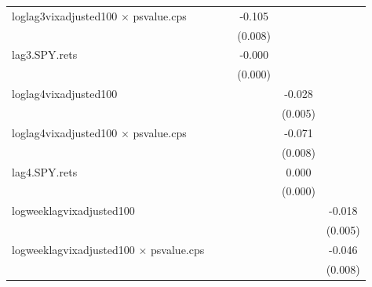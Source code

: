\documentclass[11pt,a4paper,oldfontcommands]{memoir}
\begin{document}
{\begin{footnotesize}
\begin{tiny}
\begin{longtable}{l*{5}{c}}
loglag3vixadjusted100 $\times$ psvalue.cps&                     &                     &      -0.105\sym{***}&                     &                     \\
                    &                     &                     &     (0.008)         &                     &                     \\
 
lag3.SPY.rets       &                     &                     &      -0.000\sym{***}&                     &                     \\
                    &                     &                     &     (0.000)         &                     &                     \\
 
loglag4vixadjusted100&                     &                     &                     &      -0.028\sym{***}&                     \\
                    &                     &                     &                     &     (0.005)         &                     \\
 
loglag4vixadjusted100 $\times$ psvalue.cps&                     &                     &                     &      -0.071\sym{***}&                     \\
                    &                     &                     &                     &     (0.008)         &                     \\
 
lag4.SPY.rets       &                     &                     &                     &       0.000\sym{***}&                     \\
                    &                     &                     &                     &     (0.000)         &                     \\
 
logweeklagvixadjusted100&                     &                     &                     &                     &      -0.018\sym{***}\\
                    &                     &                     &                     &                     &     (0.005)         \\
 
logweeklagvixadjusted100 $\times$ psvalue.cps&                     &                     &                     &                     &      -0.046\sym{***}\\
                    &                     &                     &                     &                     &     (0.008)         \\
 

\end{longtable}
\end{tiny}
\end{footnotesize}}
\end{document}
